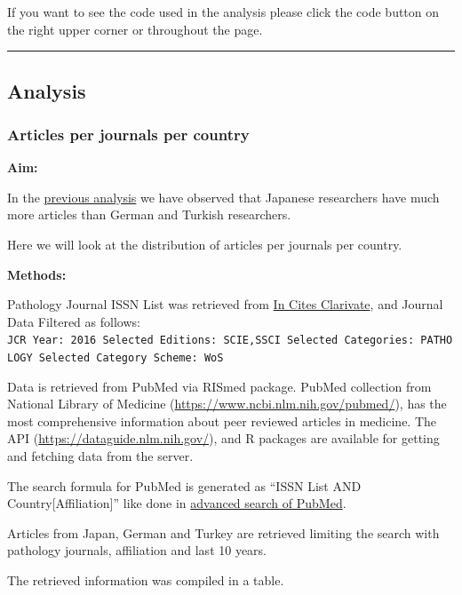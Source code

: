 \documentclass[
]{book}
\begin{document}
If you want to see the code used in the analysis please click the code button on the right upper corner or throughout the page.

\begin{center}\rule{0.5\linewidth}{0.5pt}\end{center}

\hypertarget{analysis}{%
\subsection{Analysis}\label{analysis}}

\hypertarget{articles-per-journals-per-country-1}{%
\subsubsection{Articles per journals per country}\label{articles-per-journals-per-country-1}}

\textbf{Aim:}

In the \href{https://sbalci.github.io/pubmed/CountryBasedComparison.html}{previous analysis} we have observed that Japanese researchers have much more articles than German and Turkish researchers.

Here we will look at the distribution of articles per journals per country.

\textbf{Methods:}

Pathology Journal ISSN List was retrieved from \href{https://jcr.incites.thomsonreuters.com/}{In Cites Clarivate}, and Journal Data Filtered as follows: \texttt{JCR\ Year:\ 2016\ Selected\ Editions:\ SCIE,SSCI\ Selected\ Categories:\ \textquotesingle{}PATHOLOGY\textquotesingle{}\ Selected\ Category\ Scheme:\ WoS}

Data is retrieved from PubMed via RISmed package.
PubMed collection from National Library of Medicine (\url{https://www.ncbi.nlm.nih.gov/pubmed/}), has the most comprehensive information about peer reviewed articles in medicine.
The API (\url{https://dataguide.nlm.nih.gov/}), and R packages are available for getting and fetching data from the server.

The search formula for PubMed is generated as ``ISSN List AND Country{[}Affiliation{]}'' like done in \href{https://www.ncbi.nlm.nih.gov/pubmed/advanced}{advanced search of PubMed}.

Articles from Japan, German and Turkey are retrieved limiting the search with pathology journals, affiliation and last 10 years.

The retrieved information was compiled in a table.
\end{document}
